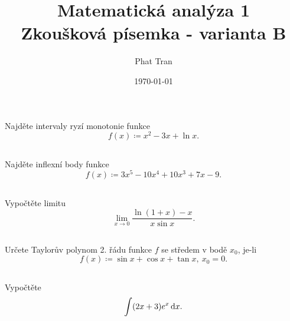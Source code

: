 \documentclass[12pt]{article}
\title{\Huge{\textbf{Matematická analýza 1}} \\ \huge{Zkoušková písemka - varianta B}}
\author{Phat Tran}
\date{\today}
\begin{document}
\maketitle
\thispagestyle{empty}
\setcounter{page}{0}
\newpage

\section{}

    \subsection{}
    \begin{tcolorbox}
        Najděte intervaly ryzí monotonie funkce
        $$ f(x) \coloneq x^2 - 3x +\ln{x} . $$
    \end{tcolorbox}
    
    \pagebreak
    
    \subsection{}
    \begin{tcolorbox}
        Najděte inflexní body funkce
        $$ f(x) \coloneq 3x^5 - 10x^4 + 10x^3 + 7x - 9 . $$
    \end{tcolorbox}
    
    \pagebreak

    \subsection{}
    \begin{tcolorbox}
        Vypočtěte limitu
        $$ \lim_{x \rightarrow 0} \frac{\ln{(1 + x)} - x}{x\sin{x}} . $$
    \end{tcolorbox}
    
    \pagebreak

    \subsection{}
    \begin{tcolorbox}
        Určete Taylorův polynom 2. řádu funkce $f$ se středem v bodě $x_0$, je-li
        $$ f(x) \coloneq \sin{x} + \cos{x} + \tan{x},\ x_0 = 0 . $$
    \end{tcolorbox}
    
    \pagebreak

    \subsection{}
    \begin{tcolorbox}
        Vypočtěte
        $$ \int (2x + 3)e^x \mathop{}\!\mathrm{d}{x} . $$
    \end{tcolorbox}
    
    \pagebreak
\end{document}
